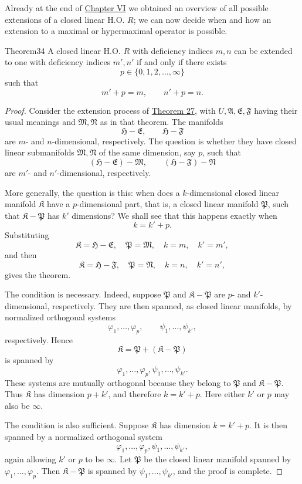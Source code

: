 ﻿\documentclass[paper=b5,fontsize=13pt,bookmarkpackage=false,twoside]{scrartcl}
\begin{document}
Already at the end of \hyperref[chap:VI]{Chapter VI} we obtained an overview of all possible extensions of a closed linear H.O. $R$; we can now decide when and how an extension to a maximal or hypermaximal operator is possible.

\begin{namedstatement}{Theorem}{34}\label{thm:34}
A closed linear H.O. $R$ with deficiency indices $m,n$ can be extended to one with deficiency indices $m',n'$ if and only if there exists
\[
p\in\{0,1,2,\ldots,\infty\}
\]
such that
\[
m'+p=m,\qquad n'+p=n.
\]
\end{namedstatement}

\begin{proof}
Consider the extension process of \hyperref[thm:27]{Theorem 27}, with $U,\mathfrak A,\mathfrak E,\mathfrak F$ having their usual meanings and $\mathfrak M,\mathfrak N$ as in that theorem. The manifolds
\[
\mathfrak H-\mathfrak E,\qquad
\mathfrak H-\mathfrak F
\]
are $m$- and $n$-dimensional, respectively. The question is whether they have closed linear submanifolds $\mathfrak M,\mathfrak N$ of the same dimension, say $p$, such that
\[
(\mathfrak H-\mathfrak E)-\mathfrak M,
\qquad
(\mathfrak H-\mathfrak F)-\mathfrak N
\]
are $m'$- and $n'$-dimensional, respectively.

More generally, the question is this: when does a $k$-dimensional closed linear manifold $\mathfrak K$ have a $p$-dimensional part, that is, a closed linear manifold $\mathfrak P$, such that $\mathfrak K-\mathfrak P$ has $k'$ dimensions? We shall see that this happens exactly when
\[
k=k'+p.
\]
Substituting
\[
\mathfrak K=\mathfrak H-\mathfrak E,\quad
\mathfrak P=\mathfrak M,\quad
k=m,\quad k'=m',
\]
and then
\[
\mathfrak K=\mathfrak H-\mathfrak F,\quad
\mathfrak P=\mathfrak N,\quad
k=n,\quad k'=n',
\]
gives the theorem.

The condition is necessary. Indeed, suppose $\mathfrak P$ and $\mathfrak K-\mathfrak P$ are $p$- and $k'$-dimensional, respectively. They are then spanned, as closed linear manifolds, by normalized orthogonal systems
\[
\varphi_1,\ldots,\varphi_p,
\qquad
\psi_1,\ldots,\psi_{k'},
\]
respectively. Hence
\[
\mathfrak K=\mathfrak P+(\mathfrak K-\mathfrak P)
\]
is spanned by
\[
\varphi_1,\ldots,\varphi_p,\psi_1,\ldots,\psi_{k'}.
\]
These systems are mutually orthogonal because they belong to $\mathfrak P$ and $\mathfrak K-\mathfrak P$. Thus $\mathfrak K$ has dimension $p+k'$, and therefore $k=k'+p$. Here either $k'$ or $p$ may also be $\infty$.

The condition is also sufficient. Suppose $\mathfrak K$ has dimension $k=k'+p$. It is then spanned by a normalized orthogonal system
\[
\varphi_1,\ldots,\varphi_p,\psi_1,\ldots,\psi_{k'},
\]
again allowing $k'$ or $p$ to be $\infty$. Let $\mathfrak P$ be the closed linear manifold spanned by $\varphi_1,\ldots,\varphi_p$. Then $\mathfrak K-\mathfrak P$ is spanned by $\psi_1,\ldots,\psi_{k'}$, and the proof is complete.
\end{proof}
\end{document}
